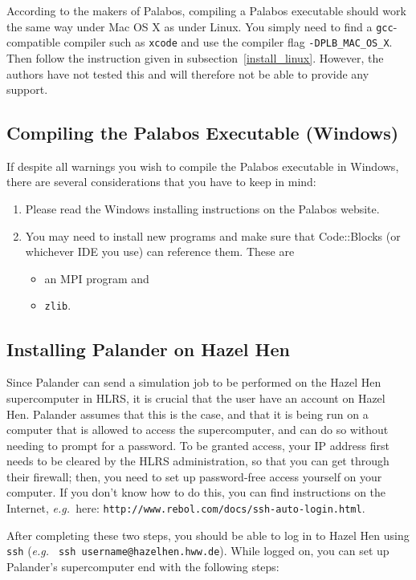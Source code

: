 \documentclass[12pt]{article}
\newcommand{\eg}{\emph{e.g.\ }}
\begin{document}
According to the makers of Palabos, compiling a Palabos executable should work the same way under Mac OS X as 
under Linux. You simply need to find a \verb|gcc|-compatible compiler such as \verb|xcode| and use the 
compiler flag \verb|-DPLB_MAC_OS_X|. Then follow the instruction given in subsection~\ref{install_linux}. 
However, the authors have not tested this and will therefore not be able to provide any support.

\subsection{Compiling the Palabos Executable (Windows)}

If despite all warnings you wish to compile the Palabos executable in Windows, there are several 
considerations that you have to keep in mind:
\begin{enumerate}
\item Please read the Windows installing instructions on the Palabos website.
\item You may need to install new programs and make sure that Code::Blocks (or whichever IDE you use) can 
reference them. These are
\begin{itemize}
\item an MPI program and
\item \verb|zlib|.
\end{itemize}
\end{enumerate}

\subsection{Installing Palander on Hazel Hen} \label{install_cluster}

Since Palander can send a simulation job to be performed on the Hazel Hen supercomputer in HLRS, it is 
crucial that the user have an account on Hazel Hen. Palander assumes that this is the case, and that it is 
being run on a computer that is allowed to access the supercomputer, and can do so without needing to prompt 
for a password. To be granted access, your IP address first needs to be cleared by the HLRS administration, 
so that you can get through their firewall; then, you need to set up password-free access yourself on your 
computer. If you don't know how to do this, you can find instructions on the Internet, \eg here: 
\verb|http://www.rebol.com/docs/ssh-auto-login.html|.

After completing these two steps, you should be able to log in to Hazel Hen using \verb|ssh| (\eg 
\verb|ssh username@hazelhen.hww.de|). While logged on, you can set up Palander's supercomputer end with the 
following steps:
\end{document}
